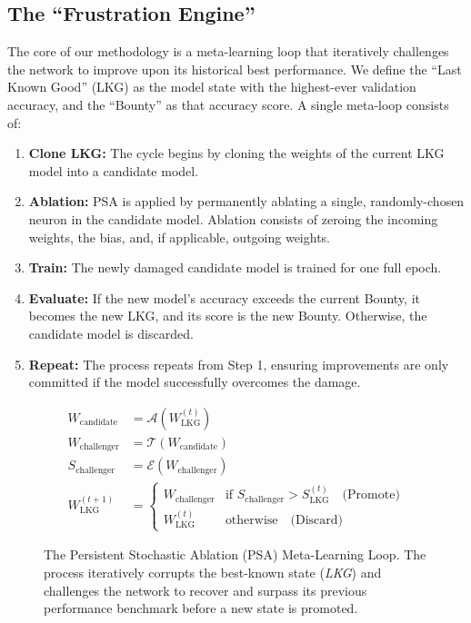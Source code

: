 \documentclass[conference]{IEEEtran}
\begin{document}
\subsection{The ``Frustration Engine''}
The core of our methodology is a meta-learning loop that iteratively challenges the network to improve upon its historical best performance. We define the ``Last Known Good'' (LKG) as the model state with the highest-ever validation accuracy, and the ``Bounty'' as that accuracy score. A single meta-loop consists of:
\begin{enumerate}
    \item \textbf{Clone LKG:} The cycle begins by cloning the weights of the current LKG model into a candidate model.
    \item \textbf{Ablation:} PSA is applied by permanently ablating a single, randomly-chosen neuron in the candidate model. Ablation consists of zeroing the incoming weights, the bias, and, if applicable, outgoing weights.
    \item \textbf{Train:} The newly damaged candidate model is trained for one full epoch.
    \item \textbf{Evaluate:} If the new model's accuracy exceeds the current Bounty, it becomes the new LKG, and its score is the new Bounty. Otherwise, the candidate model is discarded.
    \item \textbf{Repeat:} The process repeats from Step 1, ensuring improvements are only committed if the model successfully overcomes the damage.
\end{enumerate}

\begin{figure}[h!]
\centering
\begin{align*}
W_{\text{candidate}} &= \mathcal{A}(W_{\text{LKG}}^{(t)}) \\[1em]
W_{\text{challenger}} &= \mathcal{T}(W_{\text{candidate}}) \\[1em]
S_{\text{challenger}} &= \mathcal{E}(W_{\text{challenger}}) \\[1em]
W_{\text{LKG}}^{(t+1)} &=
\begin{cases}
W_{\text{challenger}} & \text{if } S_{\text{challenger}} > S_{\text{LKG}}^{(t)} \quad \text{(Promote)} \\
W_{\text{LKG}}^{(t)} & \text{otherwise} \quad \text{(Discard)}
\end{cases}
\end{align*}
\caption{The Persistent Stochastic Ablation (PSA) Meta-Learning Loop. The process iteratively corrupts the best-known state (\textit{LKG}) and challenges the network to recover and surpass its previous performance benchmark before a new state is promoted.}
\label{fig:psa-loop}
\end{figure}
\end{document}
